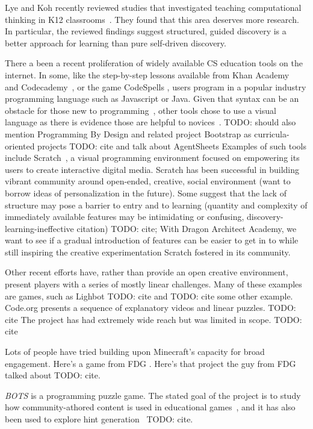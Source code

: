 \documentclass{sig-alternate}
\newcommand{\TODO}[1]{{\color{red} TODO: #1}}
\newcommand{\gametitle}{{\color{RoyalPurple} Dragon Architect Academy}}
\begin{document}
Lye and Koh recently reviewed studies that investigated teaching computational thinking in K12 classrooms~\cite{lye2014review}.
They found that this area deserves more research.
In particular, the reviewed findings suggest structured, guided discovery is a better approach for learning than pure self-driven discovery.

There a been a recent proliferation of widely available CS education tools on the internet.
In some, like the step-by-step lessons available from Khan Academy~\cite{khanacademy} and Codecademy~\cite{codecademy}, or the game CodeSpells \cite{esper2013codespells}, users program in a popular industry programming language such as Javascript or Java.
Given that syntax can be an obstacle for those new to programming~\cite{stefik2013syntax}, other tools chose to use a visual language as there is evidence those are helpful to novices~\cite{whitley1997visual}.
\TODO{should also mention Programming By Design and related project Bootstrap as curricula-oriented projects}
\TODO{cite and talk about AgentSheets}
Examples of such tools include Scratch~\cite{maloney2010scratch}, a visual programming environment focused on empowering its users to create interactive digital media.
Scratch has been successful in building vibrant community around open-ended, creative, social environment (want to borrow ideas of personalization in the future).
Some suggest that the lack of structure may pose a barrier to entry and to learning (quantity and complexity of immediately available features may be intimidating or confusing, discovery-learning-ineffective citation) \TODO{cite};
With \gametitle{}, we want to see if a gradual introduction of features can be easier to get in to while still inspiring the creative experimentation Scratch fostered in its community.

Other recent efforts have, rather than provide an open creative environment, present players with a series of mostly linear challenges.
Many of these examples are games, such as Lighbot \TODO{cite} and \TODO{cite some other example}.
Code.org presents a sequence of explanatory videos and linear puzzles. \TODO{cite}
The project has had extremely wide reach but was limited in scope. \TODO{cite}

Lots of people have tried building upon Minecraft's capacity for broad engagement.
Here's a game from FDG \cite{zorn2013minecraft}.
Here's that project the guy from FDG talked about \TODO{cite}.

\emph{BOTS} is a programming puzzle game. The stated goal of the project is to study how community-athored content is used in educational games~\cite{hickspart14}, and it has also been used to explore hint generation~\TODO{cite}.
\end{document}

